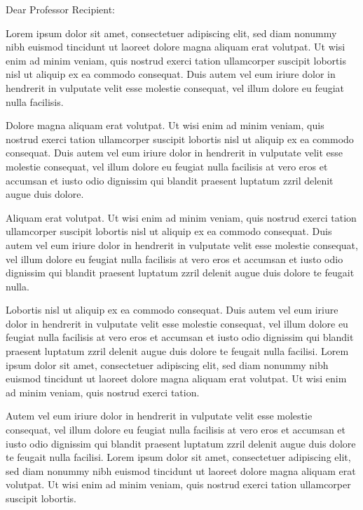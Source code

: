 \documentclass{hmcletter}
\date{January 1, 2009}
\begin{document}
\opening{Dear Professor Recipient:}



Lorem ipsum dolor sit amet, consectetuer adipiscing elit, sed diam
nonummy nibh euismod tincidunt ut laoreet dolore magna aliquam
erat volutpat. Ut wisi enim ad minim veniam, quis nostrud exerci
tation ullamcorper suscipit lobortis nisl ut aliquip ex ea commodo
consequat. Duis autem vel eum iriure dolor in hendrerit in
vulputate velit esse molestie consequat, vel illum dolore eu
feugiat nulla facilisis.

Dolore magna aliquam erat volutpat. Ut wisi enim ad minim veniam,
quis nostrud exerci tation ullamcorper suscipit lobortis nisl ut
aliquip ex ea commodo consequat. Duis autem vel eum iriure dolor
in hendrerit in vulputate velit esse molestie consequat, vel illum
dolore eu feugiat nulla facilisis at vero eros et accumsan et
iusto odio dignissim qui blandit praesent luptatum zzril delenit
augue duis dolore.

Aliquam erat volutpat. Ut wisi enim ad minim veniam, quis nostrud
exerci tation ullamcorper suscipit lobortis nisl ut aliquip ex ea
commodo consequat. Duis autem vel eum iriure dolor in hendrerit in
vulputate velit esse molestie consequat, vel illum dolore eu
feugiat nulla facilisis at vero eros et accumsan et iusto odio
dignissim qui blandit praesent luptatum zzril delenit augue duis
dolore te feugait nulla.

Lobortis nisl ut aliquip ex ea commodo consequat. Duis autem vel
eum iriure dolor in hendrerit in vulputate velit esse molestie
consequat, vel illum dolore eu feugiat nulla facilisis at vero
eros et accumsan et iusto odio dignissim qui blandit praesent
luptatum zzril delenit augue duis dolore te feugait nulla
facilisi. Lorem ipsum dolor sit amet, consectetuer adipiscing
elit, sed diam nonummy nibh euismod tincidunt ut laoreet dolore
magna aliquam erat volutpat. Ut wisi enim ad minim veniam, quis
nostrud exerci tation.

Autem vel eum iriure dolor in hendrerit in vulputate velit esse
molestie consequat, vel illum dolore eu feugiat nulla facilisis at
vero eros et accumsan et iusto odio dignissim qui blandit praesent
luptatum zzril delenit augue duis dolore te feugait nulla
facilisi. Lorem ipsum dolor sit amet, consectetuer adipiscing
elit, sed diam nonummy nibh euismod tincidunt ut laoreet dolore
magna aliquam erat volutpat. Ut wisi enim ad minim veniam, quis
nostrud exerci tation ullamcorper suscipit lobortis.
\end{document}
